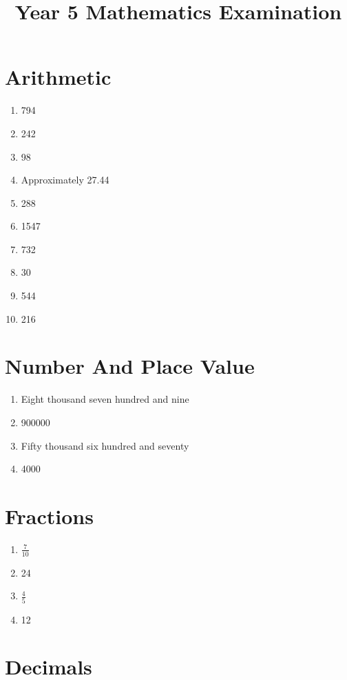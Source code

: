 \documentclass[10pt,a4paper]{article}
\begin{document}
\title{Year 5 Mathematics Examination}
\date{}
\maketitle

\section*{Arithmetic}

\begin{enumerate}
\item 794
\item 242
\item 98
\item Approximately 27.44
\item 288
\item 1547
\item 732
\item 30
\item 544
\item 216
\end{enumerate}

\section *{Number And Place Value}

\begin{enumerate}
\item Eight thousand seven hundred and nine
\item 900000
\item Fifty thousand six hundred and seventy
\item 4000
\end{enumerate}

\section *{Fractions}

\begin{enumerate}
\item $\frac{7}{10}$
\item 24
\item $\frac{4}{5}$
\item 12
\end{enumerate}

\section *{Decimals}
\end{document}
